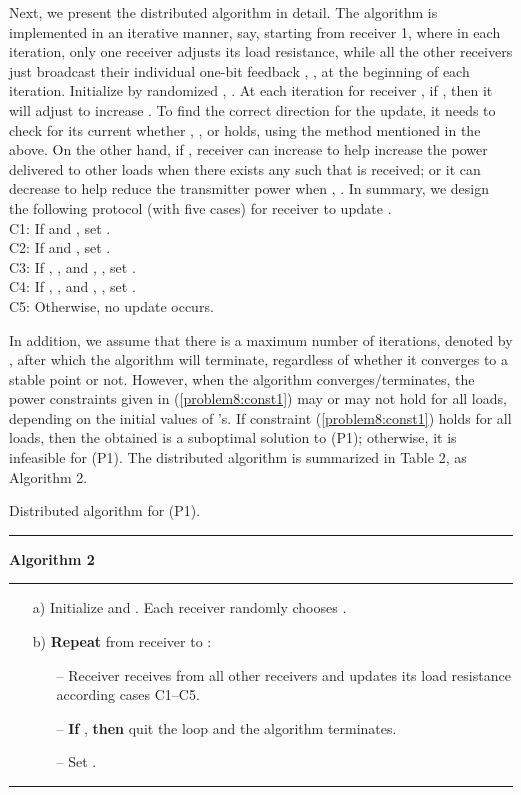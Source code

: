 \documentclass[onecolumn, a4size, 11pt]{IEEEtran}
\begin{document}
Next, we present the distributed algorithm in detail. 
The algorithm is implemented in an iterative manner, say, starting from receiver 1, where in each iteration, only one receiver  adjusts its load resistance, while all the other receivers just broadcast their individual one-bit feedback , , at the beginning of each iteration. 
Initialize by randomized  , .  
At each iteration for receiver , if   , then it will adjust  to increase . 
To find the correct direction for the update, it needs to check for its current   whether  ,  , or  holds, using the method mentioned  in the above. On the other hand,  if , receiver  can increase   to help increase the power delivered to other loads when there exists any  such that  is received;  or it can decrease   to help reduce the transmitter power when , . 
In summary, we design the following protocol (with five cases) for  receiver  to update .  \\
C1: \hspace{.5mm}If \hspace{.2mm} and , set  . \\
C2: \hspace{.5mm}If \hspace{.2mm}  and , set  . \\
C3: If , , and  , , set .  \\
C4: If , , and   , , set .  \\
C5: Otherwise, no update occurs. 

In addition, we assume that there is a maximum number of iterations, denoted by  , after which the algorithm will terminate, regardless of whether it converges to a stable point   or not.  However, when the algorithm converges/terminates,  the power constraints  given in (\ref{problem8:const1}) may or may not hold for all loads, depending on the initial values of 's. 
If constraint (\ref{problem8:const1}) holds for all loads, then the obtained     is a suboptimal  solution to (P1); otherwise, it is infeasible for (P1). 
The  distributed algorithm  is summarized in Table 2, as Algorithm 2. \hspace{-3mm}

\begin{table}[t!]
\begin{center} 
\caption{Distributed algorithm for  (P1).} \scriptsize{
 \hrule
\textbf{Algorithm 2}
\hrule 
\begin{itemize}
\item[a)]  Initialize  and . Each receiver  randomly chooses .
\item[b)]  {\bf Repeat} from receiver  to :
\begin{itemize}
\item[--] Receiver   receives  from all other receivers  and  updates its load resistance  according cases C1--C5. 
\item[--] {\bf If} \hspace{1mm}, {\bf then} quit the loop and the algorithm terminates. 
\item[--] Set . 
\end{itemize}
\end{itemize}
\hrule \label{algorithm:1} }
\end{center} 
\end{table}  
\end{document}
